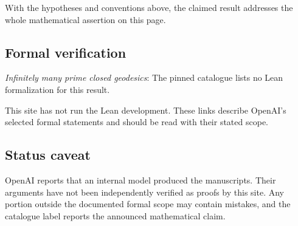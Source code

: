 \documentclass[11pt]{article}
\begin{document}
With the hypotheses and conventions above, the claimed result addresses the whole mathematical assertion on this page.

\subsection{Formal verification}
\textit{Infinitely many prime closed geodesics}: The pinned catalogue lists no Lean formalization for this result.

This site has not run the Lean development. These links describe OpenAI’s selected formal statements and should be read with their stated scope.

\subsection{Status caveat}
OpenAI reports that an internal model produced the manuscripts. Their arguments have not been independently verified as proofs by this site. Any portion outside the documented formal scope may contain mistakes, and the catalogue label reports the announced mathematical claim.
\end{document}
